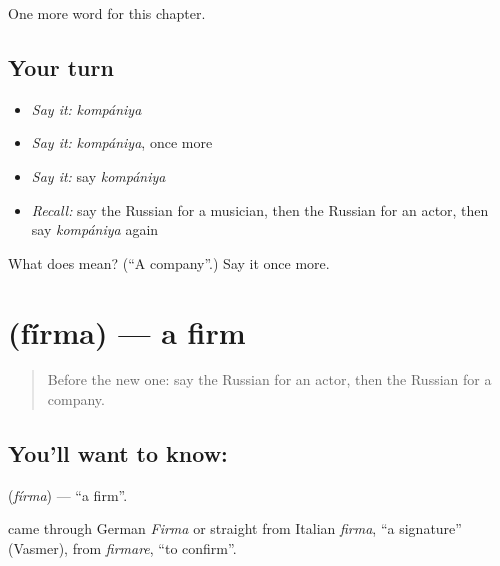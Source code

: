 \begin{grammarlens}[title={What you've built}]
One more word for this chapter.
\end{grammarlens}

\subsection*{Your turn}
\begin{itemize}
\raggedright
  \item \emph{Say it:} \emph{kompániya}
  \item \emph{Say it:} \emph{kompániya}, once more
  \item \emph{Say it:} say \emph{kompániya}
  \item \emph{Recall:} say the Russian for a musician, then the Russian for an actor, then say \emph{kompániya} again
\end{itemize}

\begin{tcolorbox}[breakable,colback=teal!4,colframe=teal!35!black,title={Before you move on}]
What does  mean? (\textquotedblleft{}A company\textquotedblright{}.) Say it once more.
\end{tcolorbox}
\section[\texorpdfstring{\ru{фирма} (fírma)}{фирма (fírma)}]{ (fírma) — a firm}

\label{lesson:RU-C257-firma}



\begin{quote}
Before the new one: say the Russian for an actor, then the Russian for a company.
\end{quote}

\subsection*{You'll want to know: }
\textbf{} (\emph{fírma}) — \textquotedblleft{}a firm\textquotedblright{}.

\begin{cousinweb}
\textbf{} came through German \emph{Firma} or straight from Italian \emph{firma}, \textquotedblleft{}a signature\textquotedblright{} (Vasmer), from \emph{firmare}, \textquotedblleft{}to confirm\textquotedblright{}.
\end{cousinweb}

